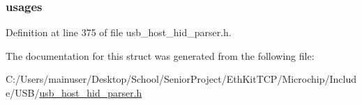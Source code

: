 \subsubsection[{usages}]{ usages}\label{struct___u_s_b___h_i_d___d_e_v_i_c_e___r_p_t___i_n_f_o_a5a827ee628f6e4d6953ee6af48b51ff3}


Definition at line 375 of file usb\+\_\+host\+\_\+hid\+\_\+parser.\+h.



The documentation for this struct was generated from the following file\+:\begin{DoxyCompactItemize}
\item 
C\+:/\+Users/mainuser/\+Desktop/\+School/\+Senior\+Project/\+Eth\+Kit\+T\+C\+P/\+Microchip/\+Include/\+U\+S\+B/\hyperlink{usb__host__hid__parser_8h}{usb\+\_\+host\+\_\+hid\+\_\+parser.\+h}\end{DoxyCompactItemize}

